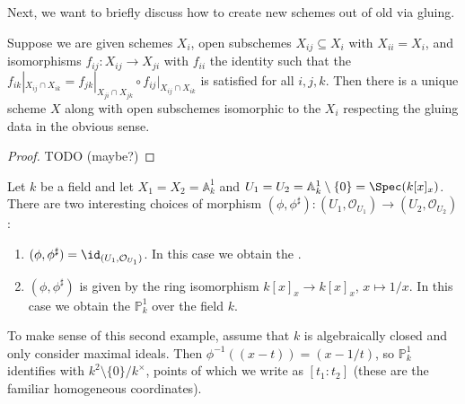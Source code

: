 \documentclass[wip, algebra]{bsteffan-lecturenotes}
\newcommand{\cO}{\mathcal{O}}
\newcommand{\A}{\mathbb{A}}
\renewcommand{\P}{\mathbb{P}}
\begin{document}
Next, we want to briefly discuss how to create new schemes out of old via gluing.
\begin{proposition}
	Suppose we are given schemes $X_i$, open subschemes $X_{ij} \subseteq X_i$ with $X_{ii} = X_i$, and isomorphisms $f_{ij}\colon X_{ij} \to X_{ji}$ with $f_{ii}$ the identity such that the  $f_{ik}|_{X_{ij} \cap X_{ik}} = f_{jk}|_{X_{ji} \cap X_{jk}} \circ f_{ij}|_{X_{ij} \cap X_{ik}}$ is satisfied for all $i, j, k$.
	Then there is a unique scheme $X$ along with open subschemes isomorphic to the $X_i$ respecting the gluing data in the obvious sense.
\end{proposition}
\begin{proof}
	TODO (maybe?)
\end{proof}
\begin{example}
	Let $k$ be a field and let $X_1 = X_2 = \A^1_k$ and $U_1 = U_2 = \A^1_k \setminus \{0\} = \Spec(k[x]_x)$. 
	There are two interesting choices of morphism $(\phi, \phi^\sharp)\colon (U_1, \cO_{U_1}) \to (U_2, \cO_{U_2})$:
	\begin{enumerate}
		\item $(\phi, \phi^\sharp) = \id_{(U_1, \cO_{U_1})}$.
			In this case we obtain the .
		\item $(\phi, \phi^\sharp)$ is given by the ring isomorphism $k[x]_x \to k[x]_x$, $x \mapsto 1 / x$.
			In this case we obtain the  $\P^1_k$ over the field $k$.
	\end{enumerate}
\end{example}
To make sense of this second example, assume that $k$ is algebraically closed and only consider maximal ideals.
Then $\phi^{-1}((x - t)) = (x - 1 / t)$, so $\P^1_k$ identifies with $k^2 \setminus \{0\} / k^\times$, points of which we write as $[t_1 : t_2]$ (these are the familiar homogeneous coordinates).
\end{document}
